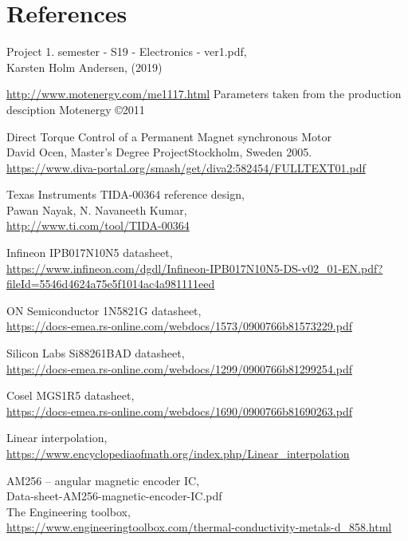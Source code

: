 \section{References}
\label{sec:references}


\begin{thebibliography}{9}
Project 1. semester - S19 - Electronics - ver1.pdf, \\
Karsten Holm Andersen, (2019)

\url{http://www.motenergy.com/me1117.html}
Parameters taken from the production desciption
Motenergy \copyright 2011

Direct Torque Control of a Permanent Magnet synchronous Motor\\
David Ocen, Master's Degree ProjectStockholm, Sweden 2005.\\
\url{https://www.diva-portal.org/smash/get/diva2:582454/FULLTEXT01.pdf}

Texas Instruments TIDA-00364 reference design, \\
Pawan Nayak, N. Navaneeth Kumar, \\
\url{http://www.ti.com/tool/TIDA-00364}

Infineon IPB017N10N5 datasheet, \\
\url{https://www.infineon.com/dgdl/Infineon-IPB017N10N5-DS-v02_01-EN.pdf?fileId=5546d4624a75e5f1014ac4a981111eed}

ON Semiconductor 1N5821G datasheet, \\
\url{https://docs-emea.rs-online.com/webdocs/1573/0900766b81573229.pdf}

Silicon Labs Si88261BAD datasheet, \\
\url{https://docs-emea.rs-online.com/webdocs/1299/0900766b81299254.pdf}

Cosel MGS1R5 datasheet, \\
\url{https://docs-emea.rs-online.com/webdocs/1690/0900766b81690263.pdf}

Linear interpolation,  \\
\url{https://www.encyclopediaofmath.org/index.php/Linear_interpolation}

AM256 – angular magnetic encoder IC, \\
Data-sheet-AM256-magnetic-encoder-IC.pdf \\

The Engineering toolbox, \\
\url{https://www.engineeringtoolbox.com/thermal-conductivity-metals-d_858.html} \\


\end{thebibliography}